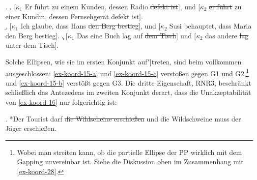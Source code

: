 \ex. \label{ex-koord-15} 
\a. \label{ex-koord-15-a}[$\kappa_1$ Er führt zu einem Kunden, dessen Radio \sout{defekt ist}], und [$\kappa_2$ \sout{er führt} zu einer Kundin, dessen Fernsehgerät defekt ist]. \\ \citep[(3-101)]{Hesse:Kuestner:85}
\b. \label{ex-koord-15-b}[$\kappa_1$ Ich glaube, dass Hans \sout{den Berg bestieg}], und [$\kappa_2$ Susi behauptet, dass Maria den Berg bestieg].  
\c. \label{ex-koord-15-c}[$\kappa_1$ Das eine Buch lag auf \sout{dem Tisch}] und [$\kappa_2$ das andere \sout{lag} unter dem Tisch]. 	\hfill \citep[150]{Lobin:93}

Solche Ellipsen, wie sie im ersten Konjunkt auf"|treten, sind beim  vollkommen ausgeschlossen: \ref{ex-koord-15-a} und \ref{ex-koord-15-c} versto\ss en gegen G1 und G2,\footnote{Wobei man streiten kann, ob die partielle Ellipse der PP wirklich mit dem Gapping unvereinbar ist. Siehe die Diskussion oben im Zusammenhang mit \ref{ex-koord-28}.} und \ref{ex-koord-15-b} verstö\ss t gegen G3.  Die dritte Eigenschaft, RNR3, beschränkt schlie\ss lich das Antezedens im zweiten Konjunkt derart, dass die Unakzeptabilität von \ref{ex-koord-16} nur folgerichtig ist:

\ex. *Der Tourist darf \sout{die Wildscheine erschie\ss en} und die Wildschweine muss der J\"ager erschie\ss en.\label{ex-koord-16} 

